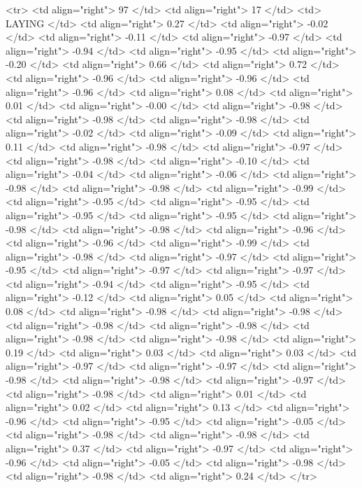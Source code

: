   <tr> <td align="right"> 97 </td> <td align="right">  17 </td> <td> LAYING </td> <td align="right"> 0.27 </td> <td align="right"> -0.02 </td> <td align="right"> -0.11 </td> <td align="right"> -0.97 </td> <td align="right"> -0.94 </td> <td align="right"> -0.95 </td> <td align="right"> -0.20 </td> <td align="right"> 0.66 </td> <td align="right"> 0.72 </td> <td align="right"> -0.96 </td> <td align="right"> -0.96 </td> <td align="right"> -0.96 </td> <td align="right"> 0.08 </td> <td align="right"> 0.01 </td> <td align="right"> -0.00 </td> <td align="right"> -0.98 </td> <td align="right"> -0.98 </td> <td align="right"> -0.98 </td> <td align="right"> -0.02 </td> <td align="right"> -0.09 </td> <td align="right"> 0.11 </td> <td align="right"> -0.98 </td> <td align="right"> -0.97 </td> <td align="right"> -0.98 </td> <td align="right"> -0.10 </td> <td align="right"> -0.04 </td> <td align="right"> -0.06 </td> <td align="right"> -0.98 </td> <td align="right"> -0.98 </td> <td align="right"> -0.99 </td> <td align="right"> -0.95 </td> <td align="right"> -0.95 </td> <td align="right"> -0.95 </td> <td align="right"> -0.95 </td> <td align="right"> -0.98 </td> <td align="right"> -0.98 </td> <td align="right"> -0.96 </td> <td align="right"> -0.96 </td> <td align="right"> -0.99 </td> <td align="right"> -0.98 </td> <td align="right"> -0.97 </td> <td align="right"> -0.95 </td> <td align="right"> -0.97 </td> <td align="right"> -0.97 </td> <td align="right"> -0.94 </td> <td align="right"> -0.95 </td> <td align="right"> -0.12 </td> <td align="right"> 0.05 </td> <td align="right"> 0.08 </td> <td align="right"> -0.98 </td> <td align="right"> -0.98 </td> <td align="right"> -0.98 </td> <td align="right"> -0.98 </td> <td align="right"> -0.98 </td> <td align="right"> -0.98 </td> <td align="right"> 0.19 </td> <td align="right"> 0.03 </td> <td align="right"> 0.03 </td> <td align="right"> -0.97 </td> <td align="right"> -0.97 </td> <td align="right"> -0.98 </td> <td align="right"> -0.98 </td> <td align="right"> -0.97 </td> <td align="right"> -0.98 </td> <td align="right"> 0.01 </td> <td align="right"> 0.02 </td> <td align="right"> 0.13 </td> <td align="right"> -0.96 </td> <td align="right"> -0.95 </td> <td align="right"> -0.05 </td> <td align="right"> -0.98 </td> <td align="right"> -0.98 </td> <td align="right"> 0.37 </td> <td align="right"> -0.97 </td> <td align="right"> -0.96 </td> <td align="right"> -0.05 </td> <td align="right"> -0.98 </td> <td align="right"> -0.98 </td> <td align="right"> 0.24 </td> </tr>
